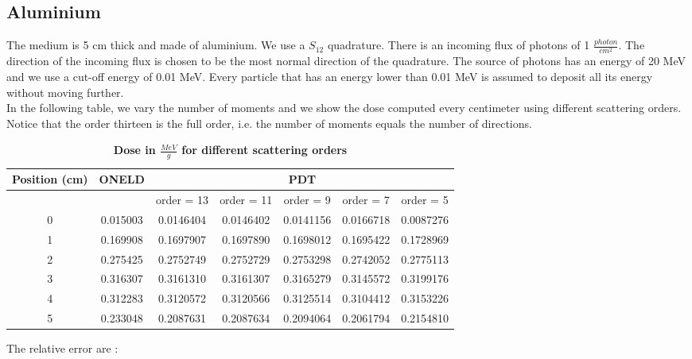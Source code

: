 \subsection{Aluminium}
The medium is 5 cm thick and made of aluminium. We use a $S_{12}$ quadrature. 
There is an incoming flux of photons of 1 $\frac{photon}{cm^2}$. The direction
of the incoming flux is 
chosen to be the most normal direction of the quadrature. The source of photons has an 
energy of 20 MeV and we use a cut-off energy of 0.01 MeV. Every particle that has 
an energy lower than 0.01 MeV is assumed to deposit all its energy without moving 
further.\\
In the following table, we vary the number of moments and we show the dose computed 
every centimeter using different scattering orders. Notice that the order
thirteen is the full order, i.e. the number of moments equals the number of directions.
\begin{table}[H]
\begin{center}
\caption{\bf{Dose in $\frac{MeV}{g}$ for different scattering orders}}
\begin{tabular}{|c|c|c|c|c|c|c|}
\hline
Position (cm) & ONELD & \multicolumn{5}{c|}{PDT} \\
\hline
   & & order = 13 & order = 11 & order = 9 & order = 7 & order = 5 \\
\hline
0 & 0.015003 & 0.0146404 & 0.0146402 & 0.0141156 & 0.0166718 & 0.0087276 \\
1 & 0.169908 & 0.1697907 & 0.1697890 & 0.1698012 & 0.1695422 & 0.1728969 \\
2 & 0.275425 & 0.2752749 & 0.2752729 & 0.2753298 & 0.2742052 & 0.2775113 \\
3 & 0.316307 & 0.3161310 & 0.3161307 & 0.3165279 & 0.3145572 & 0.3199176 \\
4 & 0.312283 & 0.3120572 & 0.3120566 & 0.3125514 & 0.3104412 & 0.3153226 \\
5 & 0.233048 & 0.2087631 & 0.2087634 & 0.2094064 & 0.2061794 & 0.2154810 \\
\hline
\end{tabular}
\end{center}
\end{table}     
The relative error are :
